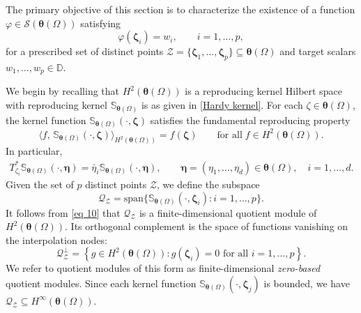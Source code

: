 \documentclass[12pt,reqno]{amsart}
\theoremstyle{remark}
\theoremstyle{definition}
\newcommand{\beq}{\begin{eqnarray}}
\newcommand{\eeq}{\end{eqnarray}}
\newcommand{\inp}[2]{\langle{#1},\,{#2} \rangle}
\begin{document}
The primary objective of this section is to characterize the existence of a function $\varphi\in \mathcal{S}(\boldsymbol \theta(\Omega))$ satisfying 
$$\varphi(\boldsymbol \zeta_i)=w_i, \qquad i=1,\ldots,p,$$
for a prescribed set of distinct points $\mathcal{Z}=\{\boldsymbol \zeta_1,\ldots,\boldsymbol \zeta_p\}\subseteq \boldsymbol \theta(\Omega)$ and target scalars $w_1,\ldots,w_p\in\mathbb D.$


We begin by recalling that $H^2(\boldsymbol \theta(\Omega))$ is a reproducing kernel Hilbert space with reproducing kernel $\mathbb S_{\boldsymbol \theta(\Omega)}$ is as given in \eqref{Hardy kernel}. For each $\zeta \in \boldsymbol \theta(\Omega)$, the kernel function $\mathbb S_{\boldsymbol \theta(\Omega)}(\cdot,\boldsymbol \zeta)$ satisfies
 the fundamental reproducing property
$$\inp{f}{\mathbb S_{\boldsymbol \theta(\Omega)}(\cdot,\boldsymbol \zeta)}_{H^2(\boldsymbol\theta(\Omega))}= f(\boldsymbol \zeta)\qquad \text{for all}\; f\in H^2(\boldsymbol \theta(\Omega)).$$
In particular, \beq \label{eq 10} T_{\zeta_i}^* \mathbb S_{\boldsymbol \theta(\Omega)}(\cdot, \boldsymbol \eta)=\bar{\eta}_i \mathbb S_{\boldsymbol\theta(\Omega)}(\cdot, \boldsymbol \eta), \qquad \boldsymbol \eta=(\eta_1,\ldots, \eta_d)\in \boldsymbol\theta(\Omega), \quad i=1,\ldots,d. \eeq
Given the set of $p$ distinct points $\mathcal{Z}$, we define the subspace
$$\mathcal{Q}_{\mathcal{Z}}=\mathrm{span}\{\mathbb S_{\boldsymbol\theta(\Omega)}(\cdot, \boldsymbol \zeta_i): i=1,\ldots, p\}.$$
It follows from \eqref{eq 10} that $\mathcal{Q}_{\mathcal{Z}}$ is a finite-dimensional quotient module of $H^2(\boldsymbol \theta(\Omega)).$ Its orthogonal complement is the space of functions vanishing on the interpolation nodes:
$$\mathcal{Q}_{\mathcal{Z}}^\perp =\left\{ g\in H^2(\boldsymbol \theta(\Omega)): g(\boldsymbol \zeta_i)=0 \text{ for all } i=1,\ldots,p\right\}.$$ We refer to quotient modules of this form as finite-dimensional {\it zero-based} quotient modules.
Since each kernel function $\mathbb S_{\boldsymbol \theta(\Omega)}(\cdot,\boldsymbol \zeta_j)$ is bounded, we have
 $\mathcal{Q}_{\mathcal{Z}} \subseteq H^\infty(\boldsymbol \theta(\Omega)).$
\end{document}
